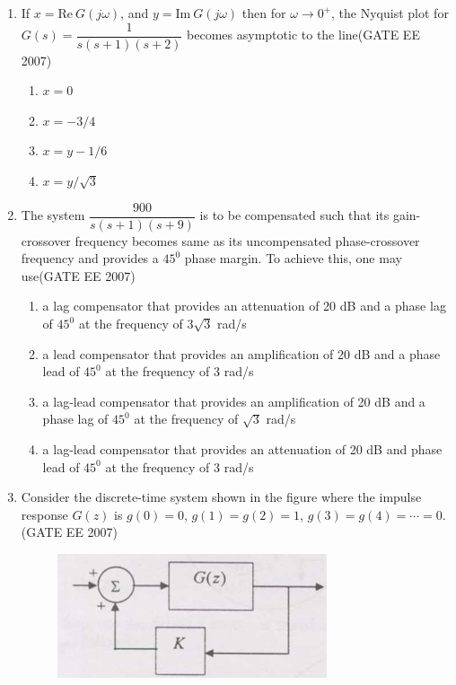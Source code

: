 \documentclass[a4paper,10pt]{exam}
\theoremstyle{remark}
\begin{document}
\begin{enumerate}
\item  \quad If $x = \text{Re}\ G(j\omega)$, and $y = \text{Im}\ G(j\omega)$ then for $\omega \to 0^{+}$, the Nyquist plot for\\
$G(s) = \dfrac{1}{s(s+1)(s+2)}$ becomes asymptotic to the line\hfill{(GATE EE 2007)} 

\begin{multicols}{4}
\begin{enumerate}
\item  $x = 0$
\item  $x = -3/4$
\item  $x = y - 1/6$
\item  $x = y/\sqrt{3}$
\end{enumerate}
\end{multicols}


\vfill
{}
\newpage

\item  \quad The system $\dfrac{900}{s(s+1)(s+9)}$ is to be compensated such that its gain-crossover frequency becomes same as its uncompensated phase-crossover frequency and provides a $45^{0}$ phase margin. To achieve this, one may use\hfill{(GATE EE 2007)} 

\begin{enumerate}
    \item a lag compensator that provides an attenuation of 20 dB and a phase lag of $45^{0}$ at the frequency of $3\sqrt{3}$ rad/s
    \item a lead compensator that provides an amplification of 20 dB and a phase lead of $45^{0}$ at the frequency of 3 rad/s
    \item a lag-lead compensator that provides an amplification of 20 dB and a phase lag of $45^{0}$ at the frequency of $\sqrt{3}$ rad/s
    \item a lag-lead compensator that provides an attenuation of 20 dB and phase lead of $45^{0}$ at the frequency of 3 rad/s
\end{enumerate}

\item  \quad Consider the discrete-time system shown in the figure where the impulse response $G(z)$ is $g(0) = 0$, $g(1) = g(2) = 1$, $g(3) = g(4) = \cdots = 0$. \hfill{(GATE EE 2007)} 

\begin{figure}[H]
    \centering
    \includegraphics[width=0.4\linewidth]{figs/q 36 2007.png}


\end{figure}
\end{enumerate}
\end{document}
